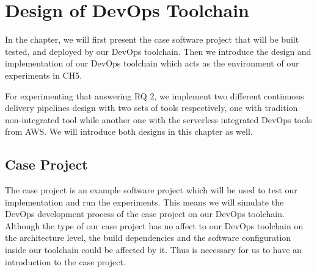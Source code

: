 \chapter{Design of DevOps Toolchain}
In the chapter, we will first present the case software project that will be built tested, and deployed by our DevOps toolchain. Then we introduce the design and implementation of our DevOps toolchain which acts as the environment of our experiments in CH5.
\par
For experimenting that answering RQ 2, we implement two different continuous delivery pipelines design with two sets of tools respectively, one with tradition non-integrated tool while another one with the serverless integrated DevOps tools from AWS. We will introduce both designs in this chapter as well.
\section{Case Project}
The case project is an example software project which will be used to test our implementation and run the experiments. This means we will simulate the DevOps development process of the case project on our DevOps toolchain. Although the type of our case project has no affect to our DevOps toolchain on the architecture level, the build dependencies and the software configuration inside our toolchain could be affected by it. Thus is necessary for us to have an introduction to the case project.
